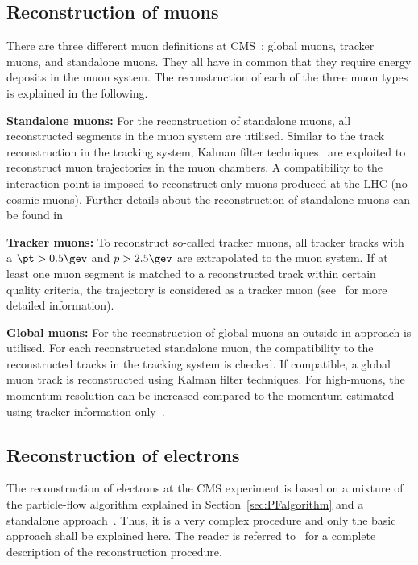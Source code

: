 \subsection{Reconstruction of muons}
\label{subsec:MuonReconstruction}
There are three different muon definitions at CMS~\cite{bib:CMS:muon_recoEff}: global muons, tracker muons, and standalone muons.
They all have in common that they require energy deposits in the muon system.
The reconstruction of each of the three muon types is explained in the following.
\begin{description}
\item \textbf{Standalone muons:} For the reconstruction of standalone muons, all reconstructed segments in the muon system are utilised. Similar to the track reconstruction in the tracking system, Kalman filter techniques~\cite{bib:KalmanFilter_1987} are exploited to reconstruct muon trajectories in the muon chambers.
A compatibility to the interaction point is imposed to reconstruct only muons produced at the LHC (no cosmic muons).
Further details about the reconstruction of standalone muons can be found in~\cite{bib:StandaloneMuonReconstruction,bib:CMS:TDR_2006} 
\item \textbf{Tracker muons:} To reconstruct so-called tracker muons, all tracker tracks with a $\pt>0.5\gev$ and $p>2.5\gev$ are extrapolated to the muon system. If at least one muon segment is matched to a reconstructed track within certain quality criteria, the trajectory is considered as a tracker muon (see~\cite{bib:CMS:muon_recoEff} for more detailed information).
\item \textbf{Global muons:} For the reconstruction of global muons an outside-in approach is utilised. For each reconstructed standalone muon, the compatibility to the reconstructed tracks in the tracking system is checked. If compatible, a global muon track is reconstructed using Kalman filter techniques. For high-\pt muons, the momentum resolution can be increased compared to the momentum estimated using tracker information only~\cite{bib:CMS:muon_recoEff}.
\end{description}

\subsection{Reconstruction of electrons}
\label{subsec:ElectronReconstruction}
The reconstruction of electrons at the CMS experiment is based on a mixture of the particle-flow algorithm explained in Section~\ref{sec:PFalgorithm} and a standalone approach~\cite{bib:StandaloneElectronReconstruction}.
Thus, it is a very complex procedure and only the basic approach shall be explained here.
The reader is referred to~\cite{bib:CMS:elec_recoEff} for a complete description of the reconstruction procedure.

